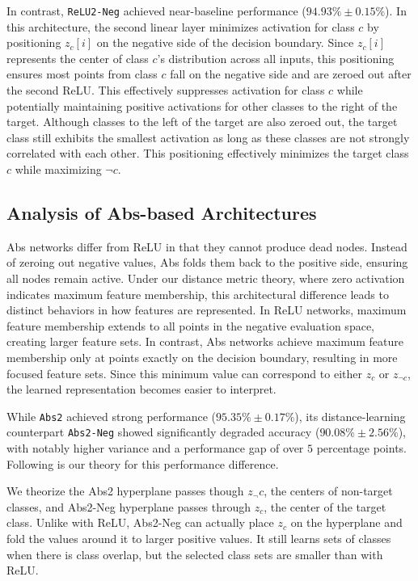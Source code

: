 In contrast, \texttt{ReLU2-Neg} achieved near-baseline performance ($94.93\% \pm 0.15\%$). In this architecture, the second linear layer minimizes activation for class $c$ by positioning $z_c[i]$ on the negative side of the decision boundary. Since $z_c[i]$ represents the center of class $c$'s distribution across all inputs, this positioning ensures most points from class $c$ fall on the negative side and are zeroed out after the second ReLU. This effectively suppresses activation for class $c$ while potentially maintaining positive activations for other classes to the right of the target. Although classes to the left of the target are also zeroed out, the target class still exhibits the smallest activation as long as these classes are not strongly correlated with each other. This positioning effectively minimizes the target class $c$ while maximizing $\neg c$.

\subsection{Analysis of Abs-based Architectures}

Abs networks differ from ReLU in that they cannot produce dead nodes. Instead of zeroing out negative values, Abs folds them back to the positive side, ensuring all nodes remain active. Under our distance metric theory, where zero activation indicates maximum feature membership, this architectural difference leads to distinct behaviors in how features are represented. In ReLU networks, maximum feature membership extends to all points in the negative evaluation space, creating larger feature sets. In contrast, Abs networks achieve maximum feature membership only at points exactly on the decision boundary, resulting in more focused feature sets. Since this minimum value can correspond to either $z_c$ or $z_{\neg c}$, the learned representation becomes easier to interpret.

While \texttt{Abs2} achieved strong performance ($95.35\% \pm 0.17\%$), its distance-learning counterpart \texttt{Abs2-Neg} showed significantly degraded accuracy ($90.08\% \pm 2.56\%$), with notably higher variance and a performance gap of over $5$ percentage points. Following is our theory for this performance difference.

We theorize the Abs2 hyperplane passes though $z_\neg c$, the centers of non-target classes, and Abs2-Neg hyperplane passes through $z_c$, the center of the target class. Unlike with ReLU, Abs2-Neg can actually place $z_c$ on the hyperplane and fold the values around it to larger positive values. It still learns sets of classes when there is class overlap, but the selected class sets are smaller than with ReLU.

